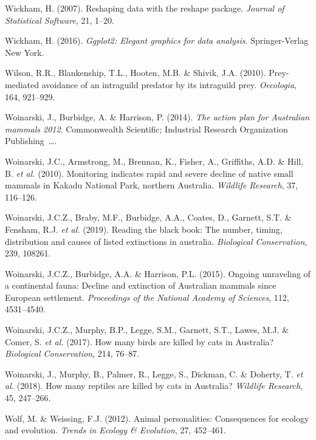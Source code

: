 \documentclass[11pt,a4paper,titlepage,twoside,openright]{style/unimelbthesis}
\begin{document}
\begin{mainmatter}
\leavevmode\hypertarget{ref-reshape}{}%
Wickham, H. (2007). Reshaping data with the reshape package. \emph{Journal of Statistical Software}, 21, 1--20.

\leavevmode\hypertarget{ref-ggplot2}{}%
Wickham, H. (2016). \emph{Ggplot2: Elegant graphics for data analysis}. Springer-Verlag New York.

\leavevmode\hypertarget{ref-wilson2010prey}{}%
Wilson, R.R., Blankenship, T.L., Hooten, M.B. \& Shivik, J.A. (2010). Prey-mediated avoidance of an intraguild predator by its intraguild prey. \emph{Oecologia}, 164, 921--929.

\leavevmode\hypertarget{ref-woinarski2014action}{}%
Woinarski, J., Burbidge, A. \& Harrison, P. (2014). \emph{The action plan for Australian mammals 2012}. Commonwealth Scientific; Industrial Research Organization Publishing~\ldots.

\leavevmode\hypertarget{ref-woinarski2010monitoring}{}%
Woinarski, J.C., Armstrong, M., Brennan, K., Fisher, A., Griffiths, A.D. \& Hill, B. \emph{et al.} (2010). Monitoring indicates rapid and severe decline of native small mammals in Kakadu National Park, northern Australia. \emph{Wildlife Research}, 37, 116--126.

\leavevmode\hypertarget{ref-woinarski2019reading}{}%
Woinarski, J.C.Z., Braby, M.F., Burbidge, A.A., Coates, D., Garnett, S.T. \& Fensham, R.J. \emph{et al.} (2019). Reading the black book: The number, timing, distribution and causes of listed extinctions in australia. \emph{Biological Conservation}, 239, 108261.

\leavevmode\hypertarget{ref-woinarski2015ongoing}{}%
Woinarski, J.C.Z., Burbidge, A.A. \& Harrison, P.L. (2015). Ongoing unraveling of a continental fauna: Decline and extinction of Australian mammals since European settlement. \emph{Proceedings of the National Academy of Sciences}, 112, 4531--4540.

\leavevmode\hypertarget{ref-woinarski2017birds}{}%
Woinarski, J.C.Z., Murphy, B.P., Legge, S.M., Garnett, S.T., Lawes, M.J. \& Comer, S. \emph{et al.} (2017). How many birds are killed by cats in Australia? \emph{Biological Conservation}, 214, 76--87.

\leavevmode\hypertarget{ref-woinarski2018reptiles}{}%
Woinarski, J., Murphy, B., Palmer, R., Legge, S., Dickman, C. \& Doherty, T. \emph{et al.} (2018). How many reptiles are killed by cats in Australia? \emph{Wildlife Research}, 45, 247--266.

\leavevmode\hypertarget{ref-wolf2012animal}{}%
Wolf, M. \& Weissing, F.J. (2012). Animal personalities: Consequences for ecology and evolution. \emph{Trends in Ecology \& Evolution}, 27, 452--461.


\end{mainmatter}
\end{document}
